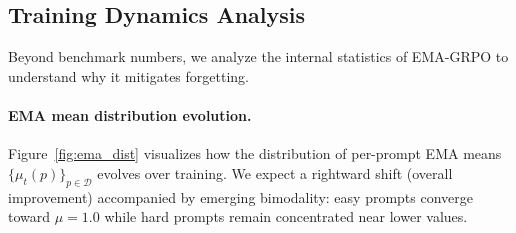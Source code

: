 \documentclass[11pt]{article}
\newcommand{\method}{EMA-GRPO}
\theoremstyle{definition}
\begin{document}
\begin{table}[t]
\centering
\caption{Scale generalization: \method{} vs.\ GRPO across training set sizes
  and model configurations (best checkpoint, $\Delta = \text{\method{}} - \text{GRPO}$).}
\label{tab:scale}
\end{table}

\subsection{Training Dynamics Analysis}
\label{sec:dynamics}

Beyond benchmark numbers, we analyze the internal statistics of \method{}
to understand why it mitigates forgetting.

\paragraph{EMA mean distribution evolution.}
Figure~\ref{fig:ema_dist} visualizes how the distribution of per-prompt
EMA means $\{\mu_t(p)\}_{p \in \mathcal{D}}$ evolves over training.
We expect a rightward shift (overall improvement) accompanied by emerging
bimodality: easy prompts converge toward $\mu=1.0$ while hard prompts
remain concentrated near lower values.
\end{document}
